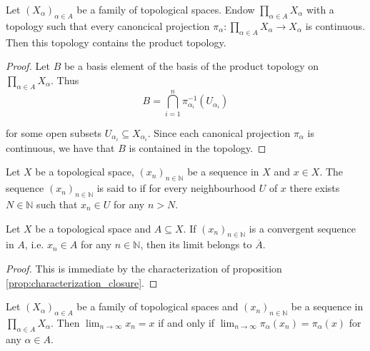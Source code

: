 \begin{proposition}
	Let $(X_\alpha)_{\alpha \in A}$ be a family of topological spaces. Endow $\prod_{\alpha \in A}X_\alpha$ with a topology such that every canoncical projection $\pi_\alpha: \prod_{\alpha \in A}X_\alpha \to X_\alpha$ is continuous. Then this topology contains the product topology.
	\label{prop:minimality_product_topology}
\end{proposition}

\begin{proof}
	Let $B$ be a basis element of the basis of the product topology on $\prod_{\alpha \in A}X_\alpha$. Thus 
	\begin{equation}
		B = \bigcap_{i = 1}^n \pi_{\alpha_i}^{-1}(U_{\alpha_i})
	\end{equation}

	\noindent for some open subsets $U_{\alpha_i} \subseteq X_{\alpha_i}$. Since each canonical projection $\pi_\alpha$ is continuous, we have that $B$ is contained in the topology.
\end{proof}
	
\begin{definition}
	Let $X$ be a topological space, $(x_n)_{n \in \mathbb{N}}$ be a sequence in $X$ and $x \in X$. The sequence $(x_n)_{n \in \mathbb{N}}$ is said to  if for every neighbourhood $U$ of $x$ there exists $N \in \mathbb{N}$ such that $x_n \in U$ for any $n > N$. 
\end{definition}

\begin{corollary}
	Let $X$ be a topological space and $A \subseteq X$. If $(x_n)_{n \in \mathbb{N}}$ is a convergent sequence in $A$, i.e. $x_n \in A$ for any $n \in \mathbb{N}$, then its limit belongs to $\overline{A}$.
	\label{cor:sequence_closure}
\end{corollary}

\begin{proof}
	This is immediate by the characterization of proposition \ref{prop:characterization_closure}.
\end{proof}

\begin{proposition}
	Let $(X_\alpha)_{\alpha \in A}$ be a family of topological spaces and $(x_n)_{n \in \mathbb{N}}$ be a sequence in $\prod_{\alpha \in A} X_\alpha$. Then $\lim_{n \to \infty}x_n = x$ if and only if $\lim_{n \to \infty} \pi_\alpha(x_n) = \pi_\alpha(x)$ for any $\alpha \in A$.
	\label{prop:convergence_product}
\end{proposition}

